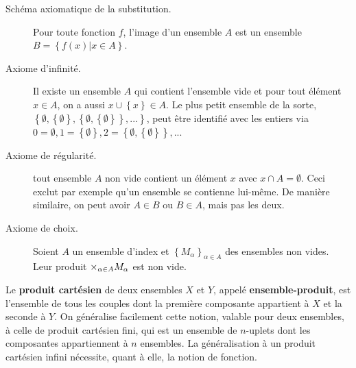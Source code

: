 \begin{description}
    \item[Schéma axiomatique de la substitution.] Pour toute fonction $f$, l'image d'un ensemble $A$ est un ensemble $B=\left\{ f(x)|x\in A \right\}$.
    \item[Axiome d'infinité.] Il existe un ensemble $A$ qui contient l'ensemble vide et pour tout élément $x\in A$, on a aussi $x\cup\left\{x\right\}\in A$. Le plus petit ensemble de la sorte, $\left\{ \emptyset, \left\{ \emptyset \right\}, \left\{ \emptyset, \left\{ \emptyset \right\} \right\},... \right\}$, peut être identifié avec les entiers via $0=\emptyset, 1 = \left\{ \emptyset \right\}, 2 = \left\{ \emptyset, \left\{ \emptyset \right\} \right\}, ...$
    \item[Axiome de régularité.] tout ensemble $A$ non vide contient un élément $x$ avec $x\cap A = \emptyset$. Ceci exclut par exemple qu'un ensemble se contienne lui-même. De manière similaire, on peut avoir $A\in B$ ou $B\in A$, mais pas les deux.
    \item[Axiome de choix.] Soient $A$ un ensemble d'index et $\left\{ M_\alpha \right\}_{\alpha\in A}$ des ensembles non vides. Leur produit $\huge{\times}_{\alpha\in A}M_\alpha$ est non vide.
\end{description}

\begin{definition}
    Le \textbf{produit cartésien} de deux ensembles $X$ et $Y$, appelé \textbf{ensemble-produit}, est l'ensemble de tous les couples dont la première composante appartient à $X$ et la seconde à $Y$. On généralise facilement cette notion, valable pour deux ensembles, à celle de produit cartésien fini, qui est un ensemble de $n$-uplets dont les composantes appartiennent à $n$ ensembles. La généralisation à un produit cartésien infini nécessite, quant à elle, la notion de fonction.
\end{definition}

